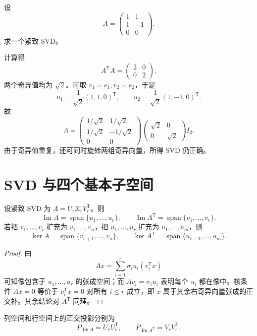 \begin{example}[title={由 $A^{\mathsf T}A$ 构造 SVD}]
设
\[
A=\begin{pmatrix}1&1\\1&-1\\0&0\end{pmatrix}.
\]
求一个紧致 SVD。
\begin{solution}
计算得
\[
A^{\mathsf T}A=\begin{pmatrix}2&0\\0&2\end{pmatrix}.
\]
两个奇异值均为 $\sqrt2$。可取 $v_1=e_1,v_2=e_2$，于是
\[
u_1=\frac1{\sqrt2}(1,1,0)^{\mathsf T},
\qquad
u_2=\frac1{\sqrt2}(1,-1,0)^{\mathsf T}.
\]
故
\[
A=\begin{pmatrix}
1/\sqrt2&1/\sqrt2\\
1/\sqrt2&-1/\sqrt2\\
0&0
\end{pmatrix}
\begin{pmatrix}\sqrt2&0\\0&\sqrt2\end{pmatrix}I_2.
\]
由于奇异值重复，还可同时旋转两组奇异向量，所得 SVD 仍正确。
\end{solution}
\end{example}

\section{SVD 与四个基本子空间}

设紧致 SVD 为 $A=U_r\Sigma_rV_r^{\mathsf T}$。则
\[
\operatorname{Im}A=\operatorname{span}\{u_1,\ldots,u_r\},
\qquad
\operatorname{Im}A^{\mathsf T}=\operatorname{span}\{v_1,\ldots,v_r\}.
\]
若把 $v_1,\ldots,v_r$ 扩充为 $v_1,\ldots,v_n$，把 $u_1,\ldots,u_r$ 扩充为 $u_1,\ldots,u_m$，则
\[
\ker A=\operatorname{span}\{v_{r+1},\ldots,v_n\},
\qquad
\ker A^{\mathsf T}=\operatorname{span}\{u_{r+1},\ldots,u_m\}.
\]

\begin{proof}
由
\[
Ax=\sum_{i=1}^r\sigma_i u_i(v_i^{\mathsf T}x)
\]
可知像包含于 $u_1,\ldots,u_r$ 的张成空间；而 $Av_i=\sigma_i u_i$ 表明每个 $u_i$ 都在像中。核条件 $Ax=0$ 等价于 $v_i^{\mathsf T}x=0$ 对所有 $i\le r$ 成立，即 $x$ 属于其余右奇异向量张成的正交补。其余结论对 $A^{\mathsf T}$ 同理。
\end{proof}

\begin{corollary}
列空间和行空间上的正交投影分别为
\[
P_{\operatorname{Im}A}=U_rU_r^{\mathsf T},
\qquad
P_{\operatorname{Im}A^{\mathsf T}}=V_rV_r^{\mathsf T}.
\]
\end{corollary}


